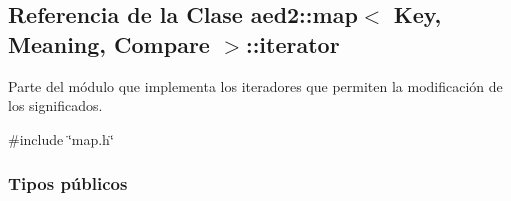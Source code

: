 \hypertarget{classaed2_1_1map_1_1iterator}{\subsection{Referencia de la Clase aed2\-:\-:map$<$ Key, Meaning, Compare $>$\-:\-:iterator}
\label{classaed2_1_1map_1_1iterator}
}


Parte del módulo que implementa los iteradores que permiten la modificación de los significados.  




{\ttfamily \#include \char`\"{}map.\-h\char`\"{}}

\subsubsection*{Tipos públicos}
